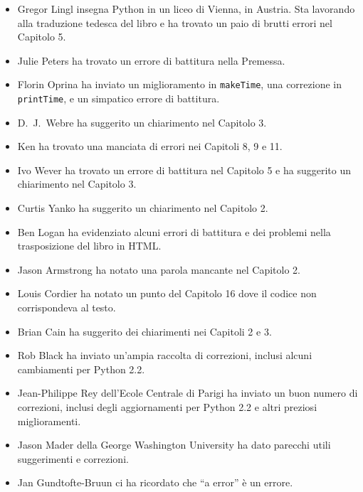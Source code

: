 \documentclass[10pt]{book}
\begin{document}
\begin{itemize}
\item Gregor Lingl insegna Python in un liceo di Vienna, in Austria. Sta lavorando alla traduzione tedesca del libro e ha trovato un paio di brutti errori nel Capitolo 5.

\item Julie Peters ha trovato un errore di battitura nella Premessa.

\item Florin Oprina ha inviato un miglioramento in {\tt makeTime},
una correzione in {\tt printTime}, e un simpatico errore di battitura.

\item D.~J.~Webre ha suggerito un chiarimento nel Capitolo 3.

\item Ken ha trovato una manciata di errori nei Capitoli 8, 9 e 11.

\item Ivo Wever ha trovato un errore di battitura nel Capitolo 5 e ha suggerito un chiarimento nel Capitolo 3.

\item Curtis Yanko ha suggerito un chiarimento nel Capitolo 2.

\item Ben Logan ha evidenziato alcuni errori di battitura e dei problemi nella trasposizione del libro in HTML.

\item Jason Armstrong ha notato una parola mancante nel Capitolo 2.

\item Louis Cordier ha notato un punto del Capitolo 16 dove il codice non corrispondeva al testo.

\item Brian Cain ha suggerito dei chiarimenti nei Capitoli 2 e 3.

\item Rob Black ha inviato un'ampia raccolta di correzioni, inclusi alcuni cambiamenti per Python 2.2.

\item Jean-Philippe Rey dell'Ecole Centrale di Parigi ha inviato un buon numero di correzioni, inclusi degli aggiornamenti per Python 2.2 e altri preziosi miglioramenti.

\item Jason Mader della George Washington University ha dato parecchi utili suggerimenti e correzioni.

\item Jan Gundtofte-Bruun ci ha ricordato che ``a error'' è un errore.


\end{itemize}
\end{document}
